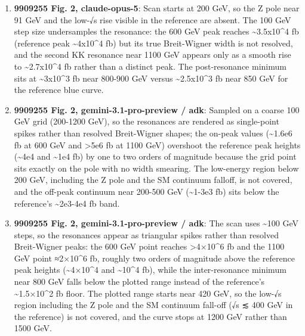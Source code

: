 \begin{enumerate}
\item \textbf{9909255 Fig. 2, claude-opus-5}: Scan starts at 200 GeV, so the Z pole near 91 GeV and the low-√s rise visible in the reference are absent. The 100 GeV step size undersamples the resonance: the 600 GeV peak reaches \textasciitilde{}3.5x10\textasciicircum{}4 fb (reference peak \textasciitilde{}4x10\textasciicircum{}4 fb) but its true Breit-Wigner width is not resolved, and the second KK resonance near 1100 GeV appears only as a smooth rise to \textasciitilde{}2.7x10\textasciicircum{}4 fb rather than a distinct peak. The post-resonance minimum sits at \textasciitilde{}3x10\textasciicircum{}3 fb near 800-900 GeV versus \textasciitilde{}2.5x10\textasciicircum{}3 fb near 850 GeV for the reference blue curve.
\item \textbf{9909255 Fig. 2, gemini-3.1-pro-preview / adk}: Sampled on a coarse 100 GeV grid (200-1200 GeV), so the resonances are rendered as single-point spikes rather than resolved Breit-Wigner shapes; the on-peak values (\textasciitilde{}1.6e6 fb at 600 GeV and >5e6 fb at 1100 GeV) overshoot the reference peak heights (\textasciitilde{}4e4 and \textasciitilde{}1e4 fb) by one to two orders of magnitude because the grid point sits exactly on the pole with no width smearing. The low-energy region below 200 GeV, including the Z pole and the SM continuum falloff, is not covered, and the off-peak continuum near 200-500 GeV (\textasciitilde{}1-3e3 fb) sits below the reference's \textasciitilde{}2e3-4e4 fb band.
\item \textbf{9909255 Fig. 2, gemini-3.1-pro-preview / adk}: The scan uses \textasciitilde{}100 GeV steps, so the resonances appear as triangular spikes rather than resolved Breit-Wigner peaks: the 600 GeV point reaches >4×10\textasciicircum{}6 fb and the 1100 GeV point ≈2×10\textasciicircum{}6 fb, roughly two orders of magnitude above the reference peak heights (\textasciitilde{}4×10\textasciicircum{}4 and \textasciitilde{}10\textasciicircum{}4 fb), while the inter-resonance minimum near 800 GeV falls below the plotted range instead of the reference's \textasciitilde{}1.5×10\textasciicircum{}2 fb floor. The plotted range starts near 420 GeV, so the low-√s region including the Z pole and the SM continuum fall-off (√s ≲ 400 GeV in the reference) is not covered, and the curve stops at 1200 GeV rather than 1500 GeV.

\end{enumerate}
